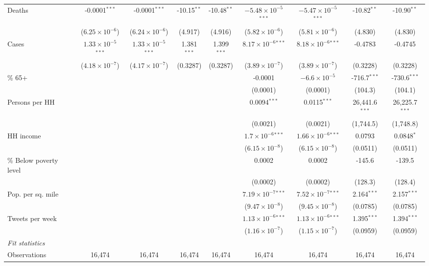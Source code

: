 \documentclass[12pt,a4]{article}
\begin{document}
\begin{landscape}
\begin{table}
{\begin{tabular}{lcccccccc}
  Deaths&-0.0001$^{***}$ & -0.0001$^{***}$ & -10.15$^{**}$ & -10.48$^{**}$ & $-5.48\times 10^{-5}$$^{***}$ & $-5.47\times 10^{-5}$$^{***}$ & -10.82$^{**}$ & -10.90$^{**}$\\
    &($6.25\times 10^{-6}$) & ($6.24\times 10^{-6}$) & (4.917) & (4.916) & ($5.82\times 10^{-6}$) & ($5.81\times 10^{-6}$) & (4.830) & (4.830)\\
  Cases&$1.33\times 10^{-5}$$^{***}$ & $1.33\times 10^{-5}$$^{***}$ & 1.381$^{***}$ & 1.399$^{***}$ & $8.17\times 10^{-6}$$^{***}$ & $8.18\times 10^{-6}$$^{***}$ & -0.4783 & -0.4745\\
    &($4.18\times 10^{-7}$) & ($4.17\times 10^{-7}$) & (0.3287) & (0.3287) & ($3.89\times 10^{-7}$) & ($3.89\times 10^{-7}$) & (0.3228) & (0.3228)\\
  
    \% 65+&   &    &    &    & -0.0001 & $-6.6\times 10^{-5}$ & -716.7$^{***}$ & -730.6$^{***}$\\
    &   &    &    &    & (0.0001) & (0.0001) & (104.3) & (104.1)\\
  Persons per HH&   &    &    &    & 0.0094$^{***}$ & 0.0115$^{***}$ & 26,441.6$^{***}$ & 26,225.7$^{***}$\\
    &   &    &    &    & (0.0021) & (0.0021) & (1,744.5) & (1,748.8)\\
  HH income&   &    &    &    & $1.7\times 10^{-6}$$^{***}$ & $1.66\times 10^{-6}$$^{***}$ & 0.0793 & 0.0848$^{*}$\\
    &   &    &    &    & ($6.15\times 10^{-8}$) & ($6.15\times 10^{-8}$) & (0.0511) & (0.0511)\\
  \% Below poverty level&   &    &    &    & 0.0002 & 0.0002 & -145.6 & -139.5\\
    &   &    &    &    & (0.0002) & (0.0002) & (128.3) & (128.4)\\
  Pop. per sq. mile&   &    &    &    & $7.19\times 10^{-7}$$^{***}$ & $7.52\times 10^{-7}$$^{***}$ & 2.164$^{***}$ & 2.157$^{***}$\\
    &   &    &    &    & ($9.47\times 10^{-8}$) & ($9.45\times 10^{-8}$) & (0.0785) & (0.0785)\\
  Tweets per week&   &    &    &    & $1.13\times 10^{-6}$$^{***}$ & $1.13\times 10^{-6}$$^{***}$ & 1.395$^{***}$ & 1.394$^{***}$\\
    &   &    &    &    & ($1.16\times 10^{-7}$) & ($1.15\times 10^{-7}$) & (0.0959) & (0.0959)\\
  \midrule \emph{Fit statistics}&  & & & & & & & \\
  Observations & 16,474&16,474&16,474&16,474&16,474&16,474&16,474&16,474\\

\end{tabular}}
\end{table}
\end{landscape}
\end{document}
